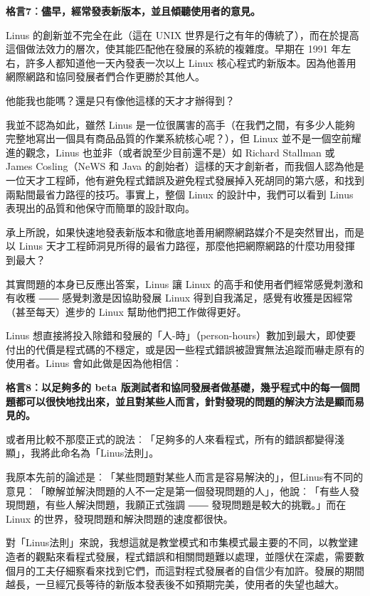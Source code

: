 \documentclass[12pt, a5paper]{book}
\begin{document}
\textbf{格言7︰儘早，經常發表新版本，並且傾聽使用者的意見。}

Linus 的創新並不完全在此（這在 UNIX
世界是行之有年的傳統了），而在於提高這個做法效力的層次，使其能匹配他在發展的系統的複雜度。早期在
1991 年左右，許多人都知道他一天內發表一次以上 Linux
核心程式旳新版本。因為他善用網際網路和協同發展者們合作更勝於其他人。

他能我也能嗎？還是只有像他這樣的天才才辦得到？

我並不認為如此，雖然 Linus
是一位很厲害的高手（在我們之間，有多少人能夠完整地寫出一個具有商品品質的作業系統核心呢？），但
Linux 並不是一個空前耀進的觀念，Linus 也並非（或者說至少目前還不是）如
Richard Stallman 或 James Cosling（NeWS 和 Java
的創始者）這樣的天才創新者，而我個人認為他是一位天才工程師，他有避免程式錯誤及避免程式發展掉入死胡同的第六感，和找到兩點間最省力路徑的技巧。事實上，整個
Linux 的設計中，我們可以看到 Linus
表現出的品質和他保守而簡單的設計取向。

承上所說，如果快速地發表新版本和徹底地善用網際網路媒介不是突然冒出，而是以
Linus
天才工程師洞見所得的最省力路徑，那麼他把網際網路的什麼功用發揮到最大？

其實問題的本身已反應出答案，Linus 讓 Linux
的高手和使用者們經常感覺刺激和有收穫 ―― 感覺刺激是因協助發展 Linux
得到自我滿足，感覺有收獲是因經常（甚至每天）進步的 Linux
幫助他們把工作做得更好。

Linus
想直接將投入除錯和發展的「人-時」（person-hours）數加到最大，即使要付出的代價是程式碼的不穩定，或是因一些程式錯誤被證實無法追蹤而嚇走原有的使用者。Linus
會如此做是因為他相信︰

\textbf{格言8︰以足夠多的 beta
版測試者和協同發展者做基礎，幾乎程式中的每一個問題都可以很快地找出來，並且對某些人而言，針對發現的問題的解決方法是顯而易見的。}

或者用比較不那麼正式的說法︰「足夠多的人來看程式，所有的錯誤都變得淺顯」，我將此命名為「Linus法則」。

我原本先前的論述是︰「某些問題對某些人而言是容易解決的」，但Linus有不同的意見︰「瞭解並解決問題的人不一定是第一個發現問題的人」，他說︰「有些人發現問題，有些人解決問題，我願正式強調
―― 發現問題是較大的挑戰。」而在 Linux
的世界，發現問題和解決問題的速度都很快。

對「Linus法則」來說，我想這就是教堂模式和市集模式最主要的不同，以教堂建造者的觀點來看程式發展，程式錯誤和相關問題難以處理，並隱伏在深處，需要數個月的工夫仔細察看來找到它們，而這對程式發展者的自信少有加許。發展的期間越長，一旦經冗長等待的新版本發表後不如預期完美，使用者的失望也越大。
\end{document}
